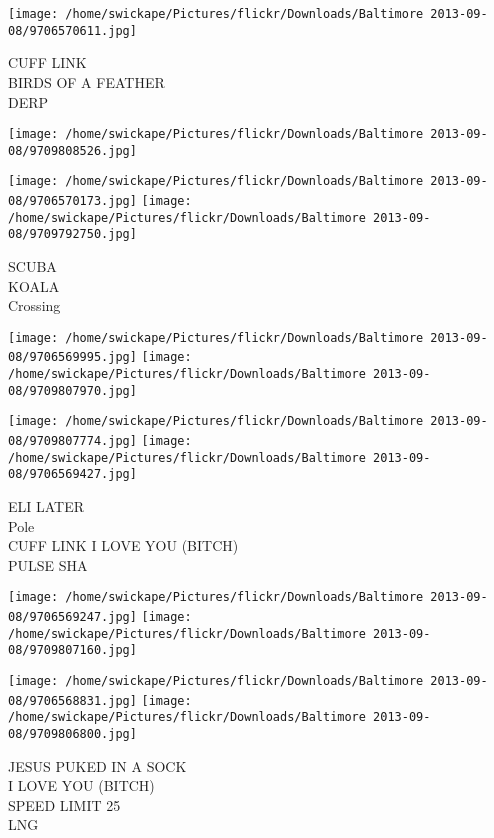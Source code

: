 \documentclass[10pt,letterpaper]{article}
\begin{document}
\texttt{[image: /home/swickape/Pictures/flickr/Downloads/Baltimore 2013-09-08/9706570611.jpg]}

CUFF LINK\\
BIRDS OF A FEATHER\\
DERP\\
\pagebreak

\texttt{[image: /home/swickape/Pictures/flickr/Downloads/Baltimore 2013-09-08/9709808526.jpg]}

\vspace{0.25in}
\texttt{[image: /home/swickape/Pictures/flickr/Downloads/Baltimore 2013-09-08/9706570173.jpg]}
\texttt{[image: /home/swickape/Pictures/flickr/Downloads/Baltimore 2013-09-08/9709792750.jpg]}

SCUBA\\
KOALA\\
Crossing\\
\pagebreak

\texttt{[image: /home/swickape/Pictures/flickr/Downloads/Baltimore 2013-09-08/9706569995.jpg]}
\texttt{[image: /home/swickape/Pictures/flickr/Downloads/Baltimore 2013-09-08/9709807970.jpg]}

\texttt{[image: /home/swickape/Pictures/flickr/Downloads/Baltimore 2013-09-08/9709807774.jpg]}
\texttt{[image: /home/swickape/Pictures/flickr/Downloads/Baltimore 2013-09-08/9706569427.jpg]}

ELI LATER\\
Pole\\
CUFF LINK I LOVE YOU (BITCH)\\
PULSE SHA\\
\pagebreak

\texttt{[image: /home/swickape/Pictures/flickr/Downloads/Baltimore 2013-09-08/9706569247.jpg]}
\texttt{[image: /home/swickape/Pictures/flickr/Downloads/Baltimore 2013-09-08/9709807160.jpg]}

\texttt{[image: /home/swickape/Pictures/flickr/Downloads/Baltimore 2013-09-08/9706568831.jpg]}
\texttt{[image: /home/swickape/Pictures/flickr/Downloads/Baltimore 2013-09-08/9709806800.jpg]}

JESUS PUKED IN A SOCK\\
I LOVE YOU (BITCH)\\
SPEED LIMIT 25\\
LNG\\
\pagebreak
\end{document}

